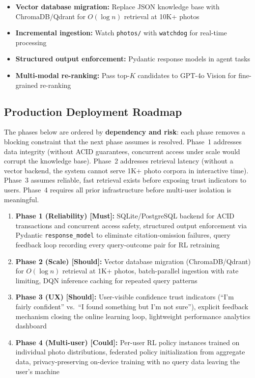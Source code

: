 \documentclass[11pt,letterpaper]{article}
\begin{document}
\begin{itemize}[nosep]
  \item \textbf{Vector database migration:} Replace JSON knowledge base with ChromaDB/Qdrant for $O(\log n)$ retrieval at 10K+ photos
  \item \textbf{Incremental ingestion:} Watch \texttt{photos/} with \texttt{watchdog} for real-time processing
  \item \textbf{Structured output enforcement:} Pydantic response models in agent tasks
  \item \textbf{Multi-modal re-ranking:} Pass top-$K$ candidates to GPT-4o Vision for fine-grained re-ranking
\end{itemize}

\subsection{Production Deployment Roadmap}

The phases below are ordered by \textbf{dependency and risk}: each phase removes a blocking constraint that the next phase assumes is resolved. Phase~1 addresses data integrity (without ACID guarantees, concurrent access under scale would corrupt the knowledge base). Phase~2 addresses retrieval latency (without a vector backend, the system cannot serve 1K+ photo corpora in interactive time). Phase~3 assumes reliable, fast retrieval exists before exposing trust indicators to users. Phase~4 requires all prior infrastructure before multi-user isolation is meaningful.

\begin{enumerate}[nosep]
  \item \textbf{Phase 1 (Reliability) [Must]:} SQLite/PostgreSQL backend for ACID transactions and concurrent access safety, structured output enforcement via Pydantic \texttt{response\_model} to eliminate citation-omission failures, query feedback loop recording every query-outcome pair for RL retraining
  \item \textbf{Phase 2 (Scale) [Should]:} Vector database migration (ChromaDB/Qdrant) for $O(\log n)$ retrieval at 1K+ photos, batch-parallel ingestion with rate limiting, DQN inference caching for repeated query patterns
  \item \textbf{Phase 3 (UX) [Should]:} User-visible confidence trust indicators (``I'm fairly confident'' vs.\ ``I found something but I'm not sure''), explicit feedback mechanism closing the online learning loop, lightweight performance analytics dashboard
  \item \textbf{Phase 4 (Multi-user) [Could]:} Per-user RL policy instances trained on individual photo distributions, federated policy initialization from aggregate data, privacy-preserving on-device training with no query data leaving the user's machine
\end{enumerate}
\end{document}
